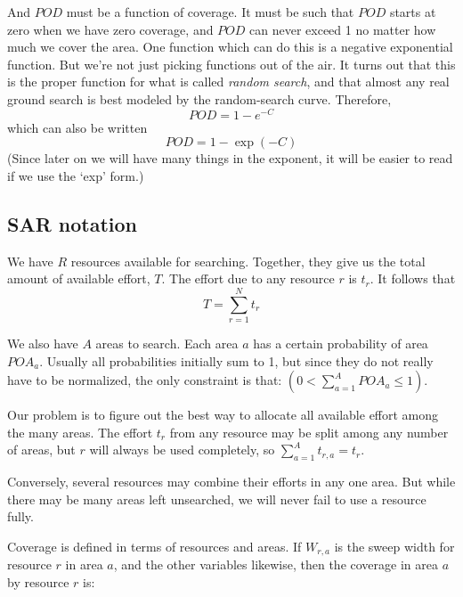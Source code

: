 And $POD$ must be a function of coverage. It must be such that $POD$
starts at zero when we have zero coverage, and $POD$ can 
never exceed 1 no matter how much we cover the area. One function
which can do this is a negative exponential function. But we're not
just picking functions out of the air. It turns out that this is the
proper function for what is called \emph{random search}, and that
almost any real ground search is best modeled by the random-search
curve. \cite{stone89:_optimal} Therefore,
\begin{equation}
  \label{eq:3}
  POD = 1 - e^{-C}
\end{equation}
which can also be written
\begin{equation}
  \label{eq:9}
  POD = 1 - \exp(-C)
\end{equation}
(Since later on we will have many things in the exponent, it will be
easier to read if we use the `exp' form.)

\subsection{SAR notation}
\label{sec:SARnotation}

We have $R$ resources available for searching. Together, they give us
the total amount of available effort, $T$. The effort due to any
resource $r$ is $t_r$. It follows that 
\begin{equation}
  \label{eq:10}
  T = \sum_{r=1}^N t_r
\end{equation}

We also have $A$ areas to search. Each area $a$ has a certain
probability of area $POA_a$. Usually all probabilities initially sum
to 1, but since they do not really have to be normalized, the only
constraint is that: $(0 < \sum_{a=1}^A POA_a \leq 1)$.

Our problem is to figure out the best way to allocate all available
effort among the many areas. The effort  $t_r$ from any resource
may be split among any number of areas, but $r$ will always be used
completely, so $\sum_{a=1}^A t_{r,a} = t_r$. 

Conversely, several resources may combine their efforts in any one
area. But while there may be many areas left unsearched, we will never
fail to use a resource fully.

Coverage is defined in terms of resources and areas. If $W_{r,a}$ is
the sweep width for resource $r$ in area $a$, and the other variables
likewise, then the coverage in area $a$ by resource $r$ is:

